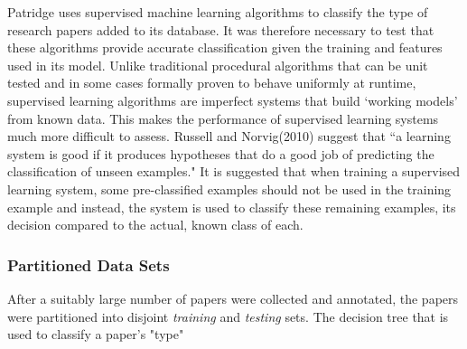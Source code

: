 Patridge uses supervised machine learning algorithms to classify the type of
research papers added to its database. It was therefore necessary to test that
these algorithms provide accurate classification given the training and
features used in its model.  Unlike traditional procedural algorithms that can
be unit tested and in some cases formally proven to behave uniformly at
runtime\cite{filliatre2007formal}, supervised learning algorithms are imperfect
systems that build `working models' from known data. This makes the performance
of supervised learning systems much more difficult to assess. Russell and
Norvig(2010) suggest that ``a learning system is good if it produces hypotheses
that do a good job of predicting the classification of unseen
examples\cite{russell2010artificial}." It is suggested that when training a
supervised learning system, some pre-classified examples should not be used in
the training example and instead, the system is used to classify these
remaining examples, its decision compared to the actual, known class of
each\cite{alpaydin2004introduction}\cite{russell2010artificial}.

\subsubsection{ Partitioned Data Sets}

After a suitably large number of papers were collected and annotated, the
papers were partitioned into disjoint \emph{training} and \emph{testing}
sets. The decision tree that is used to classify a paper's "type"  
